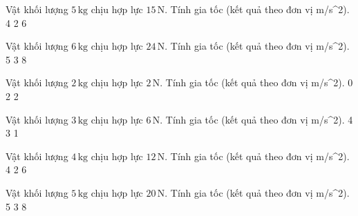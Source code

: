 \begin{ex}
Vật khối lượng $5\,\text{kg}$ chịu hợp lực $15\,\text{N}$. Tính gia tốc (kết quả theo đơn vị m/s^2).
\choice
{}
{4}
{2}
{6}
\end{ex}

\begin{ex}
Vật khối lượng $6\,\text{kg}$ chịu hợp lực $24\,\text{N}$. Tính gia tốc (kết quả theo đơn vị m/s^2).
\choice
{5}
{}
{3}
{8}
\end{ex}

\begin{ex}
Vật khối lượng $2\,\text{kg}$ chịu hợp lực $2\,\text{N}$. Tính gia tốc (kết quả theo đơn vị m/s^2).
\choice
{0}
{2}
{}
{2}
\end{ex}

\begin{ex}
Vật khối lượng $3\,\text{kg}$ chịu hợp lực $6\,\text{N}$. Tính gia tốc (kết quả theo đơn vị m/s^2).
\choice
{4}
{3}
{1}
{}
\end{ex}

\begin{ex}
Vật khối lượng $4\,\text{kg}$ chịu hợp lực $12\,\text{N}$. Tính gia tốc (kết quả theo đơn vị m/s^2).
\choice
{}
{4}
{2}
{6}
\end{ex}

\begin{ex}
Vật khối lượng $5\,\text{kg}$ chịu hợp lực $20\,\text{N}$. Tính gia tốc (kết quả theo đơn vị m/s^2).
\choice
{5}
{}
{3}
{8}
\end{ex}

